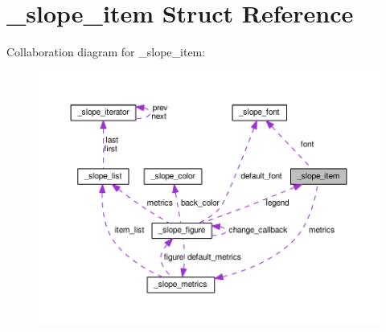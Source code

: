 \hypertarget{struct__slope__item}{\section{\+\_\+slope\+\_\+item Struct Reference}
\label{struct__slope__item}
}


Collaboration diagram for \+\_\+slope\+\_\+item\+:
\nopagebreak
\begin{figure}[H]
\begin{center}
\leavevmode
\includegraphics[width=350pt]{struct__slope__item__coll__graph}
\end{center}
\end{figure}
